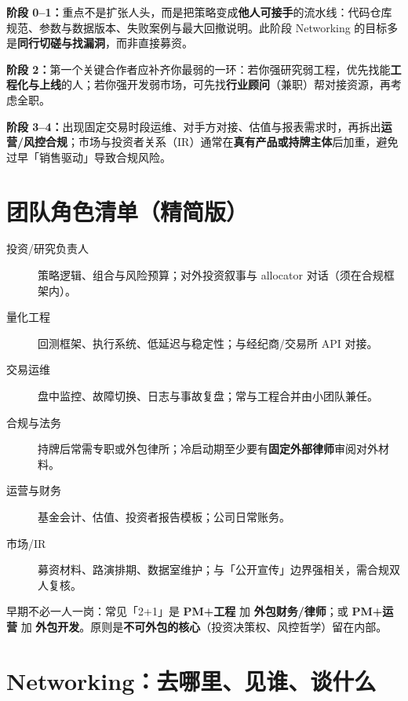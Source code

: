\textbf{阶段 0--1：}重点不是扩张人头，而是把策略变成\textbf{他人可接手}的流水线：代码仓库规范、参数与数据版本、失败案例与最大回撤说明。此阶段 Networking 的目标多是\textbf{同行切磋与找漏洞}，而非直接募资。

\textbf{阶段 2：}第一个关键合作者应补齐你最弱的一环：若你强研究弱工程，优先找能\textbf{工程化与上线}的人；若你强开发弱市场，可先找\textbf{行业顾问}（兼职）帮对接资源，再考虑全职。

\textbf{阶段 3--4：}出现固定交易时段运维、对手方对接、估值与报表需求时，再拆出\textbf{运营/风控合规}；市场与投资者关系（IR）通常在\textbf{真有产品或持牌主体}后加重，避免过早「销售驱动」导致合规风险。

\section{团队角色清单（精简版）}

\begin{description}
  \item[投资/研究负责人] 策略逻辑、组合与风险预算；对外投资叙事与 allocator 对话（须在合规框架内）。
  \item[量化工程] 回测框架、执行系统、低延迟与稳定性；与经纪商/交易所 API 对接。
  \item[交易运维] 盘中监控、故障切换、日志与事故复盘；常与工程合并由小团队兼任。
  \item[合规与法务] 持牌后常需专职或外包律所；冷启动期至少要有\textbf{固定外部律师}审阅对外材料。
  \item[运营与财务] 基金会计、估值、投资者报告模板；公司日常账务。
  \item[市场/IR] 募资材料、路演排期、数据室维护；与「公开宣传」边界强相关，需合规双人复核。
\end{description}

早期不必一人一岗：常见「2+1」是 \textbf{PM+工程} 加 \textbf{外包财务/律师}；或 \textbf{PM+运营} 加 \textbf{外包开发}。原则是\textbf{不可外包的核心}（投资决策权、风控哲学）留在内部。

\section{Networking：去哪里、见谁、谈什么}

